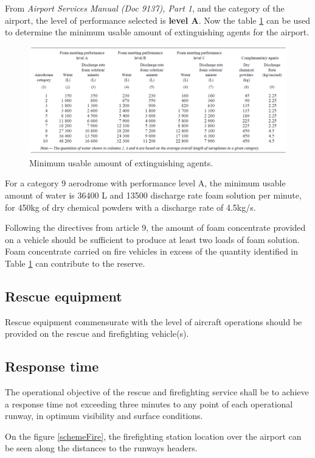 		From \textit{Airport Services Manual (Doc 9137), Part 1}, \cite{InternationalCivilAviationOrganisation2014} and the category of the airport, the level of performance selected is \textbf{level A}. Now the table \ref{table92} can be used to determine the minimum usable amount of extinguishing agents for the airport.  
		\begin{figure}[H]
			\centering
			\includegraphics[clip, trim=0cm 0cm 0cm 0cm, width=1\textwidth]{./images/firefighting/table92}
			\caption{Minimum usable amount of extinguishing agents.}
			\label{table92}
		\end{figure}
	
	For a category 9 aerodrome with performance level A, the minimum usable amount of water is 36400 L and 13500 discharge rate foam solution per minute, for 450kg of dry chemical powders with a discharge rate of 4.5kg/s.

	Following the directives from article 9, the amount of foam concentrate provided on a vehicle should be sufficient to produce at least two loads of foam solution. Foam concentrate carried on fire vehicles in excess of the quantity identified in Table \ref{table92} can contribute to the reserve.
	
		\subsection{Rescue equipment}
Rescue equipment commensurate with the level of aircraft operations should be provided on the rescue and firefighting vehicle(s).
		\subsection{Response time}
		The operational objective of the rescue and firefighting service shall be to achieve a response time not exceeding three minutes to any point of each operational runway, in optimum visibility and surface conditions.
		
		On the figure \ref{schemeFire}, the firefighting station location over the airport can be seen along the distances to the runways headers.
		

